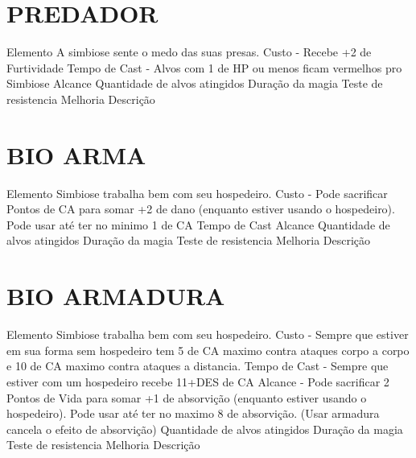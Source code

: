 \documentclass{article}%
\begin{document}
%
\section{PREDADOR}%
\label{sec:PREDADOR}%
Elemento A simbiose sente o medo das suas presas.\newline%
Custo {-} Recebe +2 de Furtividade\newline%
Tempo de Cast {-} Alvos com 1 de HP ou menos ficam vermelhos pro Simbiose\newline%
Alcance \newline%
Quantidade de alvos atingidos \newline%
Duração da magia \newline%
Teste de resistencia \newline%
Melhoria \newline%
Descrição \newline%

%
\section{BIO ARMA}%
\label{sec:BIOARMA}%
Elemento Simbiose trabalha bem com seu hospedeiro.\newline%
Custo {-} Pode sacrificar Pontos de CA para somar +2 de dano (enquanto estiver usando o hospedeiro). Pode usar até ter no minimo 1 de CA\newline%
Tempo de Cast \newline%
Alcance \newline%
Quantidade de alvos atingidos \newline%
Duração da magia \newline%
Teste de resistencia \newline%
Melhoria \newline%
Descrição \newline%

%
\section{BIO ARMADURA}%
\label{sec:BIOARMADURA}%
Elemento Simbiose trabalha bem com seu hospedeiro.\newline%
Custo {-} Sempre que estiver em sua forma sem hospedeiro tem 5 de CA maximo contra ataques corpo a corpo e 10 de CA maximo contra ataques a distancia.\newline%
Tempo de Cast {-} Sempre que estiver com um hospedeiro recebe 11+DES de CA\newline%
Alcance {-} Pode sacrificar 2 Pontos de Vida para somar +1 de absorvição (enquanto estiver usando o hospedeiro). Pode usar até ter no maximo 8 de absorvição. (Usar armadura cancela o efeito de absorvição)\newline%
Quantidade de alvos atingidos \newline%
Duração da magia \newline%
Teste de resistencia \newline%
Melhoria \newline%
Descrição \newline%

%
\end{document}
